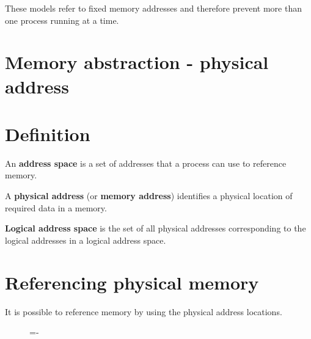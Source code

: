 \documentclass[a4paper]{systems-software}
\begin{document}
These models refer to fixed memory addresses and therefore prevent more than one process running at a time.


\section{Memory abstraction - physical address}

\section*{Definition}

An \textbf{address space} is a set of addresses that a process can use to reference memory.

A \textbf{physical address} (or \textbf{memory address}) identifies a physical location of required data in a memory.

\textbf{Logical address space} is the set of all physical addresses corresponding to the logical addresses in a logical address space.


\section*{Referencing physical memory}

It is possible to reference memory by using the physical address locations.

\begin{figure}[H]
  \lineskip=-\fboxrule
\end{figure}
\end{document}
